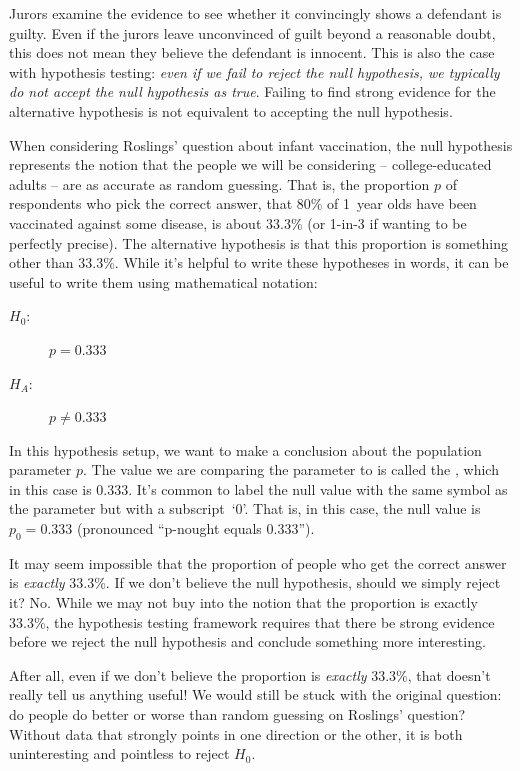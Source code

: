 Jurors examine the evidence to see whether it convincingly
shows a defendant is guilty.
Even if the jurors leave unconvinced of guilt beyond
a reasonable doubt, this does not mean they believe the
defendant is innocent.
This is also the case with hypothesis testing:
\emph{even if we fail to reject the null hypothesis,
we typically do not accept the null hypothesis as true}.
Failing to find strong evidence for the alternative
hypothesis is not equivalent to accepting
the null hypothesis.

When considering Roslings' question about infant vaccination,
the null hypothesis represents the notion that the people
we will be considering -- college-educated adults --
are as accurate as random guessing.
That is, the proportion
$p$ of respondents who pick the correct
answer, that 80\% of 1~year olds have been vaccinated
against some disease, is about 33.3\%
(or 1-in-3 if wanting to be perfectly precise).
The alternative hypothesis is that this proportion is something
other than 33.3\%. While it's helpful to write these hypotheses
in words, it can be useful to write them using mathematical
notation:
\begin{description}
\item[$H_0$:] $p = 0.333$
\item[$H_A$:] $p \neq 0.333$
\end{description}
In this hypothesis setup, we want to make a conclusion about
the population parameter $p$. The value we are comparing the
parameter to is called the , which in this
case is 0.333. It's common to label the null value with the
same symbol as the parameter but with a subscript~`0'.
That is, in this case, the null value is $p_0 = 0.333$
(pronounced ``p-nought equals 0.333'').

\begin{examplewrap}
\begin{nexample}{It may seem impossible that the
    proportion of people who get the correct answer
    is \emph{exactly} 33.3\%. If we don't believe the
    null hypothesis, should we simply reject it?}
  No. While we may not buy into the notion that
  the proportion is exactly 33.3\%, the hypothesis testing
  framework requires that there be strong evidence before
  we reject the null hypothesis and conclude something
  more interesting.

  After all, even if we don't believe the proportion is
  \emph{exactly} 33.3\%, that doesn't really tell us anything
  useful! We would still be stuck with the original question:
  do people do better or worse than random guessing on
  Roslings' question?
  Without data that strongly
  points in one direction or the other, it is both
  uninteresting and pointless to reject $H_0$.
\end{nexample}
\end{examplewrap}

